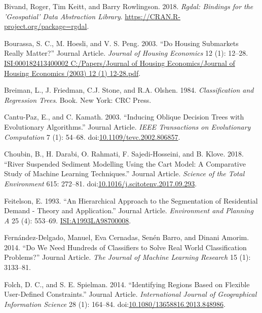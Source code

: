 \documentclass[]{elsarticle} %
\begin{document}
\hypertarget{ref-Bivand2018}{}
Bivand, Roger, Tim Keitt, and Barry Rowlingson. 2018. \emph{Rgdal:
Bindings for the 'Geospatial' Data Abstraction Library}.
\url{https://CRAN.R-project.org/package=rgdal}.

\hypertarget{ref-Bourassa2003}{}
Bourassa, S. C., M. Hoesli, and V. S. Peng. 2003. ``Do Housing
Submarkets Really Matter?'' Journal Article. \emph{Journal of Housing
Economics} 12 (1): 12--28.
\href{ISI:000182413400002\%0AC:/Papers/Journal\%20of\%20Housing\%20Economics/Journal\%20of\%20Housing\%20Economics\%20(2003)\%2012\%20(1)\%2012-28.pdf}{ISI:000182413400002
C:/Papers/Journal of Housing Economics/Journal of Housing Economics (2003) 12 (1) 12-28.pdf}.

\hypertarget{ref-Breiman1984}{}
Breiman, L., J. Friedman, C.J. Stone, and R.A. Olshen. 1984.
\emph{Classification and Regression Trees}. Book. New York: CRC Press.

\hypertarget{ref-Cantu-Paz2003}{}
Cantu-Paz, E., and C. Kamath. 2003. ``Inducing Oblique Decision Trees
with Evolutionary Algorithms.'' Journal Article. \emph{IEEE Transactions
on Evolutionary Computation} 7 (1): 54--68.
doi:\href{https://doi.org/10.1109/tevc.2002.806857}{10.1109/tevc.2002.806857}.

\hypertarget{ref-Choubin2018}{}
Choubin, B., H. Darabi, O. Rahmati, F. Sajedi-Hosseini, and B. Klove.
2018. ``River Suspended Sediment Modelling Using the Cart Model: A
Comparative Study of Machine Learning Techniques.'' Journal Article.
\emph{Science of the Total Environment} 615: 272--81.
doi:\href{https://doi.org/10.1016/j.scitotenv.2017.09.293}{10.1016/j.scitotenv.2017.09.293}.

\hypertarget{ref-Feitelson1993}{}
Feitelson, E. 1993. ``An Hierarchical Approach to the Segmentation of
Residential Demand - Theory and Application.'' Journal Article.
\emph{Environment and Planning A} 25 (4): 553--69.
\url{ISI:A1993LA98700008}.

\hypertarget{ref-FernandezDelgado2014}{}
Fernández-Delgado, Manuel, Eva Cernadas, Senén Barro, and Dinani Amorim.
2014. ``Do We Need Hundreds of Classifiers to Solve Real World
Classification Problems?'' Journal Article. \emph{The Journal of Machine
Learning Research} 15 (1): 3133--81.

\hypertarget{ref-Folch2014}{}
Folch, D. C., and S. E. Spielman. 2014. ``Identifying Regions Based on
Flexible User-Defined Constraints.'' Journal Article.
\emph{International Journal of Geographical Information Science} 28 (1):
164--84.
doi:\href{https://doi.org/10.1080/13658816.2013.848986}{10.1080/13658816.2013.848986}.
\end{document}
